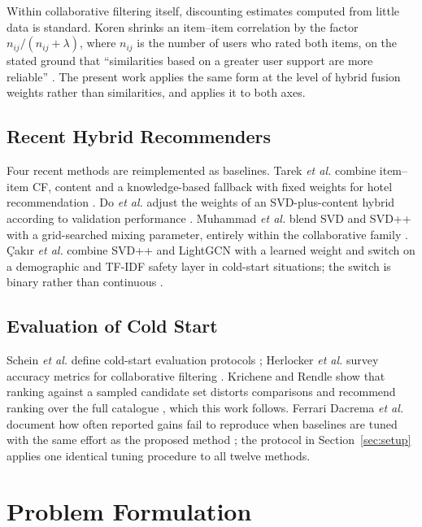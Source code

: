 \documentclass[conference]{IEEEtran}
\begin{document}
Within collaborative filtering itself, discounting estimates computed
from little data is standard. Koren shrinks an item--item
correlation by the factor $n_{ij}/(n_{ij}+\lambda)$, where $n_{ij}$
is the number of users who rated both items, on the stated ground
that ``similarities based on a greater user support are more
reliable'' \cite{koren2008}. The present work applies the same form
at the level of hybrid fusion weights rather than similarities, and
applies it to both axes.

\subsection{Recent Hybrid Recommenders}

Four recent methods are reimplemented as baselines. Tarek
\textit{et al.} combine item--item CF, content and a knowledge-based
fallback with fixed weights for hotel recommendation
\cite{tarek2022}. Do \textit{et al.} adjust the weights of an
SVD-plus-content hybrid according to validation performance
\cite{do2020}. Muhammad \textit{et al.} blend SVD and SVD++ with a
grid-searched mixing parameter, entirely within the collaborative
family \cite{ohwsf2025}. Çakır \textit{et al.} combine SVD++ and
LightGCN with a learned weight and switch on a demographic and
TF-IDF safety layer in cold-start situations; the switch is binary
rather than continuous \cite{slarec2026}.

\subsection{Evaluation of Cold Start}

Schein \textit{et al.} define cold-start evaluation protocols
\cite{schein2002}; Herlocker \textit{et al.} survey accuracy metrics
for collaborative filtering \cite{herlocker2004}. Krichene and Rendle
show that ranking against a sampled candidate set distorts
comparisons and recommend ranking over the full catalogue
\cite{krichene2020}, which this work follows. Ferrari Dacrema
\textit{et al.} document how often reported gains fail to reproduce
when baselines are tuned with the same effort as the proposed method
\cite{dacrema2019}; the protocol in Section~\ref{sec:setup} applies
one identical tuning procedure to all twelve methods.

\section{Problem Formulation}
\end{document}
